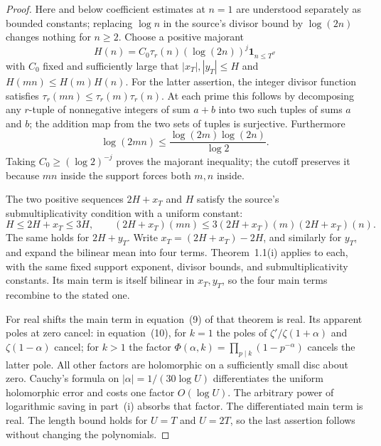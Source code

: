 \begin{proof}
Here and below coefficient estimates at \(n=1\) are understood
separately as bounded constants; replacing \(\log n\) in the
source's divisor bound by \(\log(2n)\) changes nothing for
\(n\ge2\).  Choose a positive majorant
\[
 H(n)=C_0\tau_r(n)(\log(2n))^j
                  \mathbf1_{n\le T^\vartheta}
\]
with \(C_0\) fixed and sufficiently large that
\(|x_T|,|y_T|\le H\) and \(H(mn)\le H(m)H(n)\).
For the latter assertion, the integer divisor function satisfies
\(\tau_r(mn)\le\tau_r(m)\tau_r(n)\).  At each prime this follows
by decomposing any \(r\)-tuple of nonnegative integers of sum
\(a+b\) into two such tuples of sums \(a\) and \(b\);
the addition map from the two sets of tuples is surjective.
Furthermore
\[
 \log(2mn)\le
                  \frac{\log(2m)\log(2n)}{\log2}.
\]
Taking \(C_0\ge(\log2)^{-j}\) proves the majorant inequality;
the cutoff preserves it because \(mn\) inside the support
forces both \(m,n\) inside.

The two positive sequences \(2H+x_T\) and \(H\) satisfy the
source's submultiplicativity condition with a uniform constant:
\[
 H\le2H+x_T\le3H,\qquad
 (2H+x_T)(mn)\le
           3(2H+x_T)(m)(2H+x_T)(n).
\]
The same holds for \(2H+y_T\).  Write
\(x_T=(2H+x_T)-2H\), and similarly for \(y_T\), and expand
the bilinear mean into four terms.  Theorem~1.1(i) applies to
each, with the same fixed support exponent, divisor bounds,
and submultiplicativity constants.  Its main term is itself
bilinear in \(x_T,y_T\), so the four main terms recombine
to the stated one.

For real shifts the main term in equation~(9) of that theorem
is real.  Its apparent poles at zero cancel: in equation~(10),
for \(k=1\) the poles of \(\zeta'/\zeta(1+\alpha)\) and
\(\zeta(1-\alpha)\) cancel; for \(k>1\) the factor
\(\Phi(\alpha,k)=\prod_{p\mid k}(1-p^{-\alpha})\) cancels
the latter pole.  All other factors are holomorphic on a
sufficiently small disc about zero.  Cauchy's formula on
\(|\alpha|=1/(30\log U)\) differentiates the uniform
holomorphic error and costs one factor \(O(\log U)\).
The arbitrary power of logarithmic saving in part~(i)
absorbs that factor.  The differentiated main term is real.
The length bound holds for \(U=T\) and \(U=2T\), so the
last assertion follows without changing the polynomials.
\end{proof}

